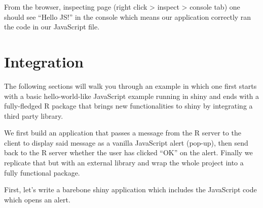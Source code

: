 \documentclass[
]{krantz}
\makeatletter
\newenvironment{Shaded}{\begin{snugshade}}{\end{snugshade}}
\newcommand{\CommentTok}[1]{\textcolor[rgb]{0.37,0.37,0.37}{\textit{#1}}}
\newcommand{\ControlFlowTok}[1]{\textcolor[rgb]{0.27,0.27,0.27}{\textbf{#1}}}
\newcommand{\DataTypeTok}[1]{\textcolor[rgb]{0.27,0.27,0.27}{#1}}
\newcommand{\KeywordTok}[1]{\textcolor[rgb]{0.27,0.27,0.27}{\textbf{#1}}}
\newcommand{\NormalTok}[1]{#1}
\newcommand{\OperatorTok}[1]{\textcolor[rgb]{0.43,0.43,0.43}{\textbf{#1}}}
\newcommand{\StringTok}[1]{\textcolor[rgb]{0.5,0.5,0.5}{#1}}
\newenvironment{kframe}{%
\medskip{}
\setlength{\fboxsep}{.8em}
 \def\at@end@of@kframe{}%
 \ifinner\ifhmode%
  \def\at@end@of@kframe{\end{minipage}}%
  \begin{minipage}{\columnwidth}%
 \fi\fi%
 \def\FrameCommand##1{\hskip\@totalleftmargin \hskip-\fboxsep
 \colorbox{shadecolor}{##1}\hskip-\fboxsep
     \hskip-\linewidth \hskip-\@totalleftmargin \hskip\columnwidth}%
 \MakeFramed {\advance\hsize-\width
   \@totalleftmargin\z@ \linewidth\hsize
   \@setminipage}}%
 {\par\unskip\endMakeFramed%
 \at@end@of@kframe}
\renewenvironment{Shaded}{\begin{kframe}}{\end{kframe}}
\makeatother
\begin{document}
\begin{Shaded}
\end{Shaded}

From the browser, inspecting page (right click \textgreater{} inspect \textgreater{} console tab) one should see ``Hello JS!'' in the console which means our application correctly ran the code in our JavaScript file.

\hypertarget{integration}{%
\section*{Integration}\label{integration}}


The following sections will walk you through an example in which one first starts with a basic hello-world-like JavaScript example running in shiny and ends with a fully-fledged R package that brings new functionalities to shiny by integrating a third party library.

We first build an application that passes a message from the R server to the client to display said message as a vanilla JavaScript alert (pop-up), then send back to the R server whether the user has clicked ``OK'' on the alert. Finally we replicate that but with an external library and wrap the whole project into a fully functional package.

First, let's write a barebone shiny application which includes the JavaScript code which opens an alert.
\end{document}
